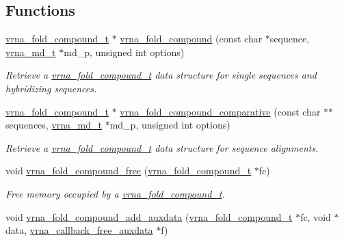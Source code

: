 \subsection*{Functions}
\begin{DoxyCompactItemize}
\item 
\mbox{\hyperlink{group__fold__compound_ga1b0cef17fd40466cef5968eaeeff6166}{vrna\+\_\+fold\+\_\+compound\+\_\+t}} $\ast$ \mbox{\hyperlink{group__fold__compound_ga6601d994ba32b11511b36f68b08403be}{vrna\+\_\+fold\+\_\+compound}} (const char $\ast$sequence, \mbox{\hyperlink{group__model__details_ga1f8a10e12a0a1915f2a4eff0b28ea17c}{vrna\+\_\+md\+\_\+t}} $\ast$md\+\_\+p, unsigned int options)
\begin{DoxyCompactList}\small\item\em Retrieve a \mbox{\hyperlink{group__fold__compound_ga1b0cef17fd40466cef5968eaeeff6166}{vrna\+\_\+fold\+\_\+compound\+\_\+t}} data structure for single sequences and hybridizing sequences. \end{DoxyCompactList}\item 
\mbox{\hyperlink{group__fold__compound_ga1b0cef17fd40466cef5968eaeeff6166}{vrna\+\_\+fold\+\_\+compound\+\_\+t}} $\ast$ \mbox{\hyperlink{group__fold__compound_gad6bacc816af274922b13d947f708aa0c}{vrna\+\_\+fold\+\_\+compound\+\_\+comparative}} (const char $\ast$$\ast$sequences, \mbox{\hyperlink{group__model__details_ga1f8a10e12a0a1915f2a4eff0b28ea17c}{vrna\+\_\+md\+\_\+t}} $\ast$md\+\_\+p, unsigned int options)
\begin{DoxyCompactList}\small\item\em Retrieve a \mbox{\hyperlink{group__fold__compound_ga1b0cef17fd40466cef5968eaeeff6166}{vrna\+\_\+fold\+\_\+compound\+\_\+t}} data structure for sequence alignments. \end{DoxyCompactList}\item 
void \mbox{\hyperlink{group__fold__compound_ga576a077b418a9c3650e06f8e5d296fc2}{vrna\+\_\+fold\+\_\+compound\+\_\+free}} (\mbox{\hyperlink{group__fold__compound_ga1b0cef17fd40466cef5968eaeeff6166}{vrna\+\_\+fold\+\_\+compound\+\_\+t}} $\ast$fc)
\begin{DoxyCompactList}\small\item\em Free memory occupied by a \mbox{\hyperlink{group__fold__compound_ga1b0cef17fd40466cef5968eaeeff6166}{vrna\+\_\+fold\+\_\+compound\+\_\+t}}. \end{DoxyCompactList}\item 
void \mbox{\hyperlink{group__fold__compound_gafc44c76a1aacf61bfccb8cd698772b98}{vrna\+\_\+fold\+\_\+compound\+\_\+add\+\_\+auxdata}} (\mbox{\hyperlink{group__fold__compound_ga1b0cef17fd40466cef5968eaeeff6166}{vrna\+\_\+fold\+\_\+compound\+\_\+t}} $\ast$fc, void $\ast$data, \mbox{\hyperlink{group__fold__compound_ga7806651f51b195013839a218b3bbd5a3}{vrna\+\_\+callback\+\_\+free\+\_\+auxdata}} $\ast$f)
$$
\end{DoxyCompactItemize}
